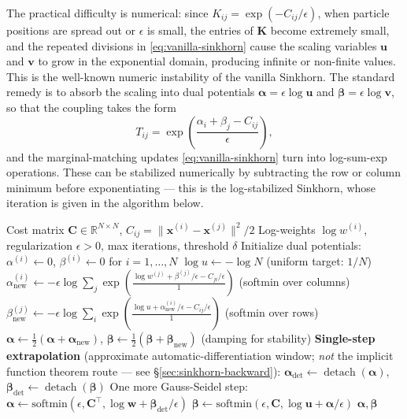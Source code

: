 \documentclass{article}
\begin{document}
The practical difficulty is numerical: since $K_{ij} = \exp(-C_{ij}/\epsilon)$, when particle positions are spread out or $\epsilon$ is small, the entries of $\mathbf{K}$ become extremely small, and the repeated divisions in \eqref{eq:vanilla-sinkhorn} cause the scaling variables $\mathbf{u}$ and $\mathbf{v}$ to grow in the exponential domain, producing infinite or non-finite values. This is the well-known numeric instability of the vanilla Sinkhorn. The standard remedy is to absorb the scaling into dual potentials $\boldsymbol{\alpha} = \epsilon \log \mathbf{u}$ and $\boldsymbol{\beta} = \epsilon \log \mathbf{v}$, so that the coupling takes the form
\begin{equation}
    T_{ij} = \exp\!\left(\frac{\alpha_i + \beta_j - C_{ij}}{\epsilon}\right),
\end{equation}
and the marginal-matching updates \eqref{eq:vanilla-sinkhorn} turn into log-sum-exp operations. These can be stabilized numerically by subtracting the row or column minimum before exponentiating --- this is the log-stabilized Sinkhorn, whose iteration is given in the algorithm below.

\begin{algorithm}[H]
\caption{Sinkhorn Iteration (Dual Potentials)}
\begin{algorithmic}[1]
\REQUIRE Cost matrix $\mathbf{C} \in \mathbb{R}^{N\times N}$, $C_{ij} = \|\mathbf{x}^{(i)}-\mathbf{x}^{(j)}\|^2/2$
\REQUIRE Log-weights $\log w^{(i)}$, regularization $\epsilon > 0$, max iterations, threshold $\delta$
\STATE Initialize dual potentials: $\alpha^{(i)} \leftarrow 0$, $\beta^{(i)} \leftarrow 0$ for $i=1,\ldots,N$
\STATE $\log u \leftarrow -\log N$ \hfill (uniform target: $1/N$)
\REPEAT
  \STATE $\alpha_{\text{new}}^{(i)} \leftarrow -\epsilon \log\sum_j \exp\!\left(\frac{\log w^{(j)} + \beta^{(j)}/\epsilon - C_{ji}/\epsilon}{1}\right)$ \hfill (softmin over columns)
  \STATE $\beta_{\text{new}}^{(j)} \leftarrow -\epsilon \log\sum_i \exp\!\left(\frac{\log u + \alpha_{\text{new}}^{(i)}/\epsilon - C_{ij}/\epsilon}{1}\right)$ \hfill (softmin over rows)
  \STATE $\boldsymbol{\alpha} \leftarrow \tfrac{1}{2}(\boldsymbol{\alpha} + \boldsymbol{\alpha}_{\text{new}})$, \quad $\boldsymbol{\beta} \leftarrow \tfrac{1}{2}(\boldsymbol{\beta} + \boldsymbol{\beta}_{\text{new}})$ \hfill (damping for stability)
\STATE \textbf{Single-step extrapolation} (approximate automatic-differentiation window; \emph{not} the implicit function theorem route --- see \S\ref{sec:sinkhorn-backward}):
\STATE $\boldsymbol{\alpha}_{\text{det}} \leftarrow \operatorname{detach}(\boldsymbol{\alpha})$, $\boldsymbol{\beta}_{\text{det}} \leftarrow \operatorname{detach}(\boldsymbol{\beta})$
\STATE One more Gauss-Seidel step: $\boldsymbol{\alpha} \leftarrow \text{softmin}(\epsilon, \mathbf{C}^\top, \log\mathbf{w} + \boldsymbol{\beta}_{\text{det}}/\epsilon)$
\STATE $\boldsymbol{\beta} \leftarrow \text{softmin}(\epsilon, \mathbf{C}, \log\mathbf{u} + \boldsymbol{\alpha}/\epsilon)$
\RETURN $\boldsymbol{\alpha}, \boldsymbol{\beta}$
\end{algorithmic}
\end{algorithm}
\end{document}
